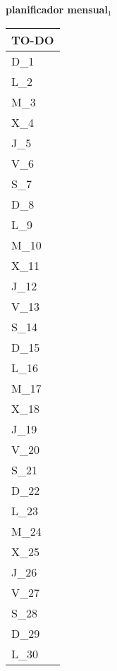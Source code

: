 \clearpage
\raggedright{
	\fontsize{25}{50}\selectfont
	\textbf{\NextYear}
}\scriptsize{\textbf{planificador mensual$_1$}}\\[11.3pt]



	\noindent\dotfill
	\renewcommand{\arraystretch}{1.5}\scriptsize
		\begin{longtabu} to \textwidth { X[l]}
		\centering \small{\textbf{TO-DO}} \\
		\toprule
		D_{1} \dotfill\\
		\hline
		L_{2} \dotfill\\
		M_{3} \dotfill\\
		X_{4} \dotfill\\
		J_{5} \dotfill\\
		V_{6} \dotfill\\
		S_{7} \dotfill\\
		D_{8} \dotfill\\
		\hline
		L_{9} \dotfill\\
		M_{10} \dotfill\\
		X_{11} \dotfill\\
		J_{12} \dotfill\\
		V_{13} \dotfill\\
		S_{14} \dotfill\\
		D_{15} \dotfill\\
		\hline
		L_{16} \dotfill\\
		M_{17} \dotfill\\
		X_{18} \dotfill\\
		J_{19} \dotfill\\
		V_{20} \dotfill\\
		S_{21} \dotfill\\
		D_{22} \dotfill\\
		\hline
		L_{23} \dotfill\\
		M_{24} \dotfill\\
		X_{25} \dotfill\\
		J_{26} \dotfill\\
		V_{27} \dotfill\\
		S_{28} \dotfill\\
		D_{29} \dotfill\\
		\hline
		L_{30} \dotfill\\

		\bottomrule

	\end{longtabu}


\clearpage
